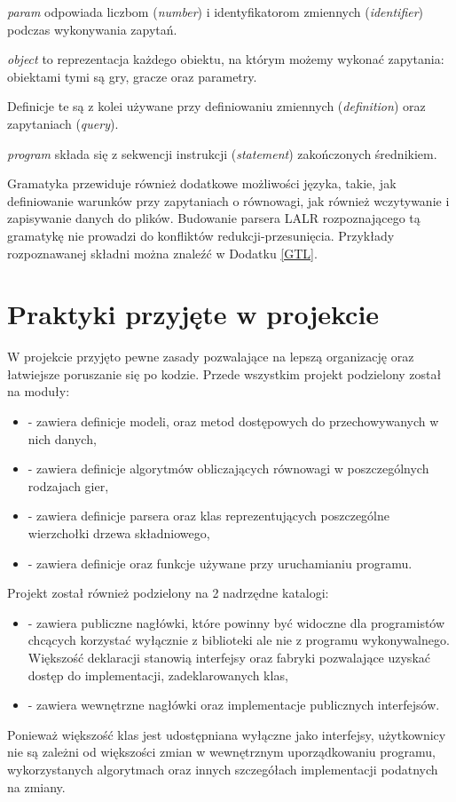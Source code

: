 \documentclass[polish]{standalone}
\begin{document}
\textit{param} odpowiada liczbom (\textit{number}) i identyfikatorom zmiennych (\textit{identifier}) podczas wykonywania
zapytań.

\textit{object} to reprezentacja każdego obiektu, na którym możemy wykonać zapytania: obiektami tymi są gry,
gracze oraz parametry.

Definicje te są z kolei używane przy definiowaniu zmiennych (\textit{definition}) oraz zapytaniach (\textit{query}).

\textit{program} składa się z sekwencji instrukcji (\textit{statement}) zakończonych średnikiem.

Gramatyka przewiduje również dodatkowe możliwości języka, takie, jak definiowanie warunków przy zapytaniach o równowagi,
jak również wczytywanie i zapisywanie danych do plików. Budowanie parsera LALR rozpoznającego tą gramatykę nie prowadzi
do konfliktów redukcji-przesunięcia. Przykłady rozpoznawanej składni można znaleźć w Dodatku \ref{GTL}.

\section{Praktyki przyjęte w projekcie}

W projekcie przyjęto pewne zasady pozwalające na lepszą organizację oraz łatwiejsze poruszanie się po kodzie. Przede
wszystkim projekt podzielony został na moduły:
\begin{itemize}
\item {} - zawiera definicje modeli, oraz metod dostępowych do przechowywanych w nich danych,
\item {} - zawiera definicje algorytmów obliczających równowagi w poszczególnych rodzajach gier,
\item {} - zawiera definicje parsera oraz klas reprezentujących poszczególne wierzchołki drzewa składniowego,
\item {} - zawiera definicje oraz funkcje używane przy uruchamianiu programu.
\end{itemize}

Projekt został również podzielony na 2 nadrzędne katalogi:
\begin{itemize}
\item {} - zawiera publiczne nagłówki, które powinny być widoczne dla programistów chcących korzystać
wyłącznie z biblioteki ale nie z programu wykonywalnego. Większość deklaracji stanowią interfejsy oraz fabryki
pozwalające uzyskać dostęp do implementacji, zadeklarowanych klas,
\item {} - zawiera wewnętrzne nagłówki oraz implementacje publicznych interfejsów.
\end{itemize}
Ponieważ większość klas jest udostępniana wyłączne jako interfejsy, użytkownicy nie są zależni od większości zmian
w wewnętrznym uporządkowaniu programu, wykorzystanych algorytmach oraz innych szczegółach implementacji podatnych
na zmiany.
\end{document}
